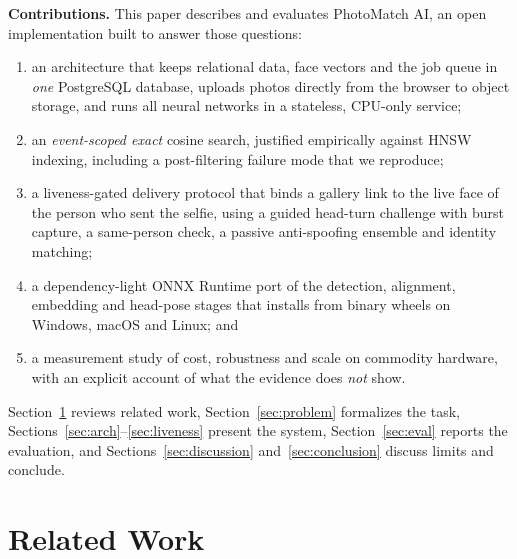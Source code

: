 \documentclass[conference]{IEEEtran}
\begin{document}
\textbf{Contributions.} This paper describes and evaluates PhotoMatch AI, an open implementation built to answer those questions:
\begin{enumerate}\setlength{\itemsep}{0pt}\setlength{\topsep}{2pt}
\item an architecture that keeps relational data, face vectors and the job queue in \emph{one} PostgreSQL database, uploads photos directly from the browser to object storage, and runs all neural networks in a stateless, CPU-only service;
\item an \emph{event-scoped exact} cosine search, justified empirically against HNSW indexing, including a post-filtering failure mode that we reproduce;
\item a liveness-gated delivery protocol that binds a gallery link to the live face of the person who sent the selfie, using a guided head-turn challenge with burst capture, a same-person check, a passive anti-spoofing ensemble and identity matching;
\item a dependency-light ONNX Runtime port of the detection, alignment, embedding and head-pose stages that installs from binary wheels on Windows, macOS and Linux; and
\item a measurement study of cost, robustness and scale on commodity hardware, with an explicit account of what the evidence does \emph{not} show.
\end{enumerate}
\noindent Section~\ref{sec:related} reviews related work, Section~\ref{sec:problem} formalizes the task, Sections~\ref{sec:arch}--\ref{sec:liveness} present the system, Section~\ref{sec:eval} reports the evaluation, and Sections~\ref{sec:discussion} and~\ref{sec:conclusion} discuss limits and conclude.

\section{Related Work}\label{sec:related}
\end{document}
